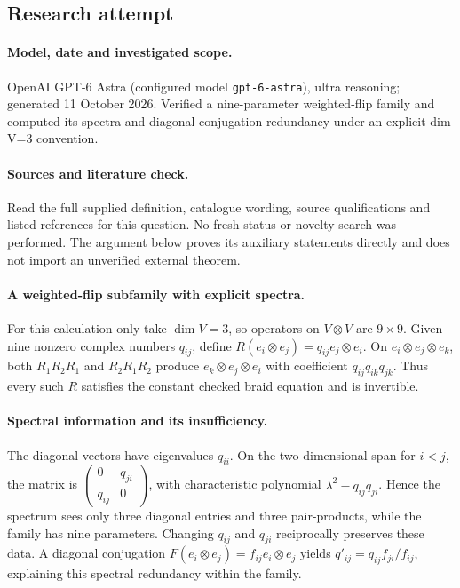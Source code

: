 \documentclass[11pt]{article}
\begin{document}
\subsection{Research attempt}
\paragraph{Model, date and investigated scope.}
OpenAI GPT-6 Astra (configured model \texttt{gpt-6-astra}), ultra reasoning; generated 11 October 2026. Verified a nine-parameter weighted-flip family and computed its spectra and diagonal-conjugation redundancy under an explicit dim V=3 convention.

\paragraph{Sources and literature check.}
Read the full supplied definition, catalogue wording, source qualifications and listed references for this question. No fresh status or novelty search was performed. The argument below proves its auxiliary statements directly and does not import an unverified external theorem.

\paragraph{A weighted-flip subfamily with explicit spectra.} For this calculation only take \(\dim V=3\), so operators on \(V\otimes V\) are \(9\times9\). Given nine nonzero complex numbers \(q_{ij}\), define \(R(e_i\otimes e_j)=q_{ij}e_j\otimes e_i\). On \(e_i\otimes e_j\otimes e_k\), both \(R_1R_2R_1\) and \(R_2R_1R_2\) produce \(e_k\otimes e_j\otimes e_i\) with coefficient \(q_{ij}q_{ik}q_{jk}\). Thus every such \(R\) satisfies the constant checked braid equation and is invertible.
\paragraph{Spectral information and its insufficiency.} The diagonal vectors have eigenvalues \(q_{ii}\). On the two-dimensional span for \(i<j\), the matrix is \(\left(\begin{smallmatrix}0&q_{ji}\\q_{ij}&0\end{smallmatrix}\right)\), with characteristic polynomial \(\lambda^2-q_{ij}q_{ji}\). Hence the spectrum sees only three diagonal entries and three pair-products, while the family has nine parameters. Changing \(q_{ij}\) and \(q_{ji}\) reciprocally preserves these data. A diagonal conjugation \(F(e_i\otimes e_j)=f_{ij}e_i\otimes e_j\) yields \(q'_{ij}=q_{ij}f_{ji}/f_{ij}\), explaining this spectral redundancy within the family.
\end{document}
